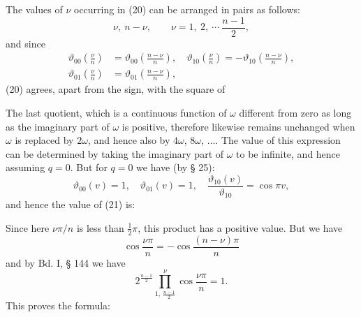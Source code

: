 The values of $\nu$ occurring in (20) can be arranged in pairs as follows:
\[
\nu,\ n-\nu, \qquad \nu = 1,\ 2,\ \cdots\ \frac{n-1}{2},
\]
and since
\[
\begin{aligned}
\vartheta_{00}\left(\frac{\nu}{n}\right) &= \vartheta_{00}\left(\frac{n-\nu}{n}\right), \quad \vartheta_{10}\left(\frac{\nu}{n}\right) = -\vartheta_{10}\left(\frac{n-\nu}{n}\right), \\
\vartheta_{01}\left(\frac{\nu}{n}\right) &= \vartheta_{01}\left(\frac{n-\nu}{n}\right),
\end{aligned}
\]
(20) agrees, apart from the sign, with the square of


The last quotient, which is a continuous function of $\omega$ different from zero as long as the imaginary part of $\omega$ is positive, therefore likewise remains unchanged when $\omega$ is replaced by $2\omega$, and hence also by $4\omega$, $8\omega$, $\ldots$. The value of this expression can be determined by taking the imaginary part of $\omega$ to be infinite, and hence assuming $q=0$. But for $q=0$ we have (by § 25):
\[
\vartheta_{00}(v) = 1, \quad \vartheta_{01}(v) = 1, \quad \frac{\vartheta_{10}(v)}{\vartheta_{10}} = \cos\pi v,
\]
and hence the value of (21) is:


Since here $\nu\pi/n$ is less than $\frac{1}{2}\pi$, this product has a positive value. But we have
\[
\cos\frac{\nu\pi}{n} = -\cos\frac{(n-\nu)\pi}{n}
\]
and by Bd. I, § 144 we have
\[
2^{\frac{n-1}{2}} \prod_{1,\,\frac{n-1}{2}}^{\nu} \cos\frac{\nu\pi}{n} = 1.
\]
This proves the formula:

